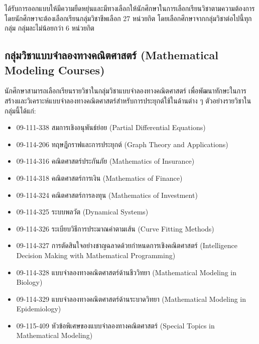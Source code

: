 \begin{doclist}
\docitem{\printprogram{} }
\end{doclist}





\printprogram{} ได้รับการออกแบบให้มีความยืดหยุ่นและมีทางเลือกให้นักศึกษาในการเลือกเรียนวิชาตามความต้องการ โดยนักศึกษาจะต้องเลือกเรียนกลุ่มวิชาชีพเลือก 27 หน่วยกิต โดยเลือกศึกษาจากกลุ่มวิชาต่อไปนี้ทุกกลุ่ม กลุ่มละไม่น้อยกว่า 6 หน่วยกิต

\subsection*{กลุ่มวิชาแบบจำลองทางคณิตศาสตร์ (Mathematical Modeling Courses)}

นักศึกษาสามารถเลือกเรียนรายวิชาในกลุ่มวิชาแบบจำลองทางคณิตศาสตร์ เพื่อพัฒนาทักษะในการสร้างและวิเคราะห์แบบจำลองทางคณิตศาสตร์สำหรับการประยุกต์ใช้ในด้านต่าง ๆ ตัวอย่างรายวิชาในกลุ่มนี้ได้แก่:
\begin{itemize}
    \item 09-111-338 สมการเชิงอนุพันธ์ย่อย (Partial Differential Equations)
    \item 09-114-206 ทฤษฎีกราฟและการประยุกต์ (Graph Theory and Applications)
    \item 09-114-316 คณิตศาสตร์ประกันภัย (Mathematics of Insurance)
    \item 09-114-318 คณิตศาสตร์การเงิน (Mathematics of Finance)
    \item 09-114-324 คณิตศาสตร์การลงทุน (Mathematics of Investment)
    \item 09-114-325 ระบบพลวัต (Dynamical Systems)
    \item 09-114-326 ระเบียบวิธีการประมาณค่าตามเส้น (Curve Fitting Methods)
    \item 09-114-327 การตัดสินใจอย่างชาญฉลาดด้วยกำหนดการเชิงคณิตศาสตร์ (Intelligence Decision Making with Mathematical Programming)
    \item 09-114-328 แบบจำลองทางคณิตศาสตร์ด้านชีววิทยา (Mathematical Modeling in Biology)
    \item 09-114-329 แบบจำลองทางคณิตศาสตร์ด้านระบาดวิทยา (Mathematical Modeling in Epidemiology)
    \item 09-115-409 หัวข้อพิเศษของแบบจำลองทางคณิตศาสตร์ (Special Topics in Mathematical Modeling)
\end{itemize}

